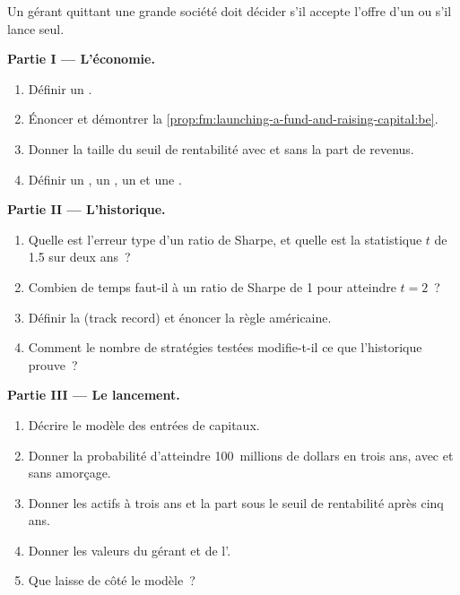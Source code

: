 \begin{problem}\label{pb:fm:launching-a-fund-and-raising-capital:1}
Un gérant quittant une grande société doit décider s'il accepte l'offre d'un  ou s'il lance seul.

\medskip\noindent\textbf{Partie I --- L'économie.}
\begin{enumerate}
\item Définir un .
\item Énoncer et démontrer la \cref{prop:fm:launching-a-fund-and-raising-capital:be}.
\item Donner la taille du seuil de rentabilité avec et sans la part de revenus.
\item Définir un , un , un  et une .
\end{enumerate}

\medskip\noindent\textbf{Partie II --- L'historique.}
\begin{enumerate}[resume]
\item Quelle est l'erreur type d'un ratio de Sharpe, et quelle est la statistique $t$ de 1.5 sur deux ans~?
\item Combien de temps faut-il à un ratio de Sharpe de 1 pour atteindre $t=2$~?
\item Définir la  (track record) et énoncer la règle américaine.
\item Comment le nombre de stratégies testées modifie-t-il ce que l'historique prouve~?
\end{enumerate}

\medskip\noindent\textbf{Partie III --- Le lancement.}
\begin{enumerate}[resume]
\item Décrire le modèle des entrées de capitaux.
\item Donner la probabilité d'atteindre 100~millions de dollars en trois ans, avec et sans amorçage.
\item Donner les actifs à trois ans et la part sous le seuil de rentabilité après cinq ans.
\item Donner les valeurs du gérant et de l'.
\item Que laisse de côté le modèle~?
\end{enumerate}


\end{problem}
